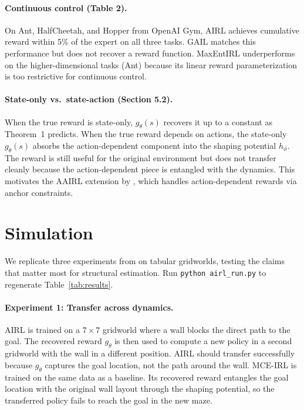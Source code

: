 \documentclass[11pt]{article}
\begin{document}
\paragraph{Continuous control (Table 2).}
On Ant, HalfCheetah, and Hopper from OpenAI Gym, AIRL achieves cumulative reward within 5\% of the expert on all three tasks.
GAIL matches this performance but does not recover a reward function.
MaxEntIRL underperforms on the higher-dimensional tasks (Ant) because its linear reward parameterization is too restrictive for continuous control.

\paragraph{State-only vs.\ state-action (Section 5.2).}
When the true reward is state-only, $g_\theta(s)$ recovers it up to a constant as Theorem~1 predicts.
When the true reward depends on actions, the state-only $g_\theta(s)$ absorbs the action-dependent component into the shaping potential $h_\phi$.
The reward is still useful for the original environment but does not transfer cleanly because the action-dependent piece is entangled with the dynamics.
This motivates the AAIRL extension by \citet{lee2026}, which handles action-dependent rewards via anchor constraints.

\section{Simulation}

We replicate three experiments from \citet{fu2018} on tabular gridworlds, testing the claims that matter most for structural estimation.
Run \texttt{python airl\_run.py} to regenerate Table~\ref{tab:results}.

\paragraph{Experiment 1: Transfer across dynamics.}
AIRL is trained on a $7 \times 7$ gridworld where a wall blocks the direct path to the goal.
The recovered reward $g_\theta$ is then used to compute a new policy in a second gridworld with the wall in a different position.
AIRL should transfer successfully because $g_\theta$ captures the goal location, not the path around the wall.
MCE-IRL is trained on the same data as a baseline.
Its recovered reward entangles the goal location with the original wall layout through the shaping potential, so the transferred policy fails to reach the goal in the new maze.
\end{document}
